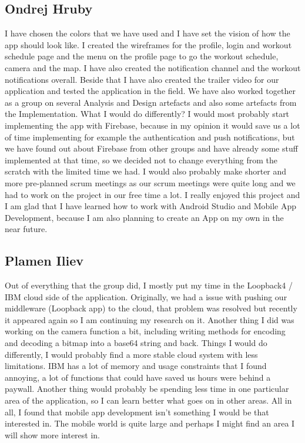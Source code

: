 \documentclass{article}
\begin{document}
\subsection*{Ondrej Hruby}
I have chosen the colors that we have used and I have set the vision of how the app should look like. I created the wireframes for the profile, login and workout schedule page and the menu on the profile page to go the workout schedule, camera and the map. I have also created the notification channel and the workout notifications overall. 
Beside that I have also created the trailer video for our application and tested the application in the field.
We have also worked together as a group on several Analysis and Design artefacts and also some artefacts from the Implementation.
What I would do differently?
I would most probably start implementing the app with Firebase, because in my opinion it would save us a lot of time implementing for example the authentication and push notifications, but we have found out about Firebase from other groups and have already some stuff implemented at that time, so we decided not to change everything from the scratch with the limited time we had. I would also probably make shorter and more pre-planned scrum meetings as our scrum meetings were quite long and we had to work on the project in our free time a lot.
I really enjoyed this project and I am glad that I have learned how to work with Android Studio and Mobile App Development, because I am also planning to create an App on my own in the near future.

\subsection*{Plamen Iliev}
Out of everything that the group did, I mostly put my time in the Loopback4 / IBM cloud side of the application. Originally, we had a issue with pushing our middleware (Loopback app) to the cloud, that problem was resolved but recently it appeared again so I am continuing my research on it.
Another thing I did was working on the camera function a bit, including writing methods for encoding and decoding a bitmap into a base64 string and back. 
Things I would do differently, I would probably find a more stable cloud system with less limitations. IBM has a lot of memory and usage constraints that I found annoying, a lot of functions that could have saved us hours were behind a paywall. Another thing would probably be spending less time in one particular area of the application, so I can learn better what goes on in other areas. All in all, I found that mobile app development isn't something I would be that interested in. The mobile world is quite large and perhaps I might find an area I will show more interest in.
\end{document}
